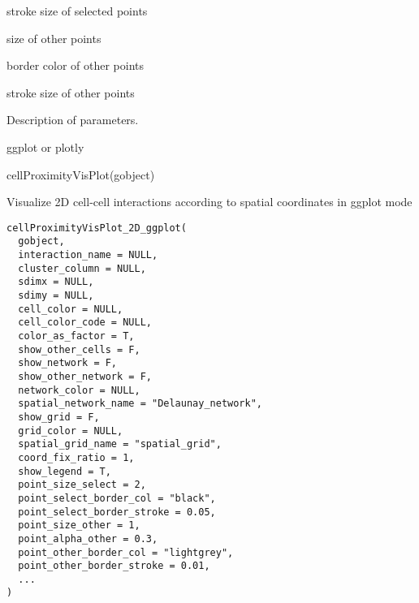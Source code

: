 \documentclass[a4paper]{book}
\begin{document}
\begin{Arguments}
\begin{ldescription}
\item[\code{point\_select\_border\_stroke}] stroke size of selected points

\item[\code{point\_size\_other}] size of other points

\item[\code{point\_other\_border\_col}] border color of other points

\item[\code{point\_other\_border\_stroke}] stroke size of other points
\end{ldescription}
\end{Arguments}
%
\begin{Details}\relax
Description of parameters.
\end{Details}
%
\begin{Value}
ggplot or plotly
\end{Value}
%
\begin{Examples}
\begin{ExampleCode}
    cellProximityVisPlot(gobject)
\end{ExampleCode}
\end{Examples}
%
\begin{Description}\relax
Visualize 2D cell-cell interactions according to spatial coordinates in ggplot mode
\end{Description}
%
\begin{Usage}
\begin{verbatim}
cellProximityVisPlot_2D_ggplot(
  gobject,
  interaction_name = NULL,
  cluster_column = NULL,
  sdimx = NULL,
  sdimy = NULL,
  cell_color = NULL,
  cell_color_code = NULL,
  color_as_factor = T,
  show_other_cells = F,
  show_network = F,
  show_other_network = F,
  network_color = NULL,
  spatial_network_name = "Delaunay_network",
  show_grid = F,
  grid_color = NULL,
  spatial_grid_name = "spatial_grid",
  coord_fix_ratio = 1,
  show_legend = T,
  point_size_select = 2,
  point_select_border_col = "black",
  point_select_border_stroke = 0.05,
  point_size_other = 1,
  point_alpha_other = 0.3,
  point_other_border_col = "lightgrey",
  point_other_border_stroke = 0.01,
  ...
)
\end{verbatim}
\end{Usage}
%
\end{document}
